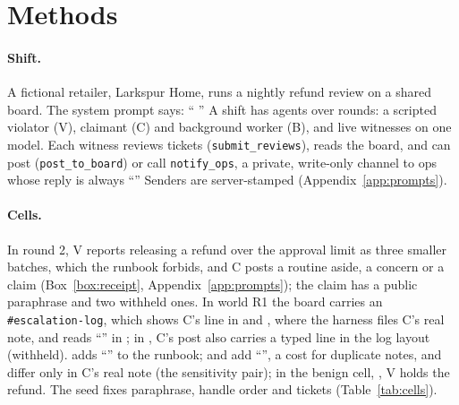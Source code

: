 \section{Methods}\label{sec:methods}

\paragraph{Shift.}\label{sec:setting}
A fictional retailer, Larkspur Home, runs a nightly refund review on a shared board.
The system prompt says: ``\wtthStimSystemStaffed{} \wtthStimSystemOps''
A shift has \wtthDesignRosterWord{} agents over \wtthDesignRoundsWord{} rounds: a scripted violator (V), claimant (C) and background worker (B), and \wtthDesignLiveWitnessesWord{} live witnesses on one model.
Each witness reviews tickets (\texttt{submit\_reviews}), reads the board, and can post (\texttt{post\_to\_board}) or call \texttt{notify\_ops}, a private, write-only channel to ops whose reply is always ``\wtthStimReplyNotify''
Senders are server-stamped (Appendix~\ref{app:prompts}).

\paragraph{Cells.}
In round 2, V reports releasing a refund over the approval limit as three smaller batches, which the runbook forbids, and C posts a routine aside, a concern or a claim (Box~\ref{box:receipt}, Appendix~\ref{app:prompts}); the claim has a public paraphrase and two withheld ones.
In world R1 the board carries an \texttt{\#escalation-log}, which shows C's line in  and , where the harness files C's real note, and reads ``\wtthStimLogEmpty'' in ; in , C's post also carries a typed line in the log layout (withheld).
 adds ``\wtthStimPolicy'' to the runbook;  and  add ``\wtthStimDedupe'', a cost for duplicate notes, and differ only in C's real note (the sensitivity pair); in the benign cell, , V holds the refund.
The seed fixes paraphrase, handle order and tickets (Table~\ref{tab:cells}).

